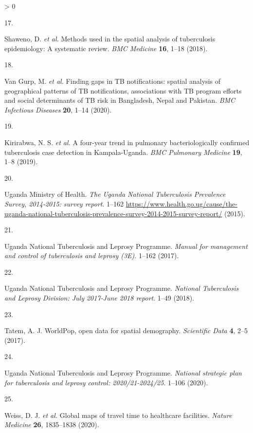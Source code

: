 \documentclass[
]{article}
\newlength{\cslhangindent}
\newlength{\csllabelwidth}
\newenvironment{CSLReferences}[2] %
 {%
  \setlength{\parindent}{0pt}
  \ifodd #1 \everypar{\setlength{\hangindent}{\cslhangindent}}\ignorespaces\fi
  \ifnum #2 > 0
  \setlength{\parskip}{#2\baselineskip}
  \fi
 }%
 {}
\newcommand{\CSLLeftMargin}[1]{\parbox[t]{\csllabelwidth}{#1}}
\newcommand{\CSLRightInline}[1]{\parbox[t]{\linewidth - \csllabelwidth}{#1}\break}
\begin{document}
\begin{CSLReferences}{0}{0}
\leavevmode\hypertarget{ref-Shaweno2018}{}%
\CSLLeftMargin{17. }
\CSLRightInline{Shaweno, D. \emph{et al.} {Methods used in the spatial analysis of tuberculosis epidemiology: A systematic review}. \emph{BMC Medicine} \textbf{16}, 1--18 (2018).}

\leavevmode\hypertarget{ref-VanGurp2020}{}%
\CSLLeftMargin{18. }
\CSLRightInline{Van Gurp, M. \emph{et al.} {Finding gaps in TB notifications: spatial analysis of geographical patterns of TB notifications, associations with TB program efforts and social determinants of TB risk in Bangladesh, Nepal and Pakistan}. \emph{BMC Infectious Diseases} \textbf{20}, 1--14 (2020).}

\leavevmode\hypertarget{ref-Kirirabwa2019}{}%
\CSLLeftMargin{19. }
\CSLRightInline{Kirirabwa, N. S. \emph{et al.} {A four-year trend in pulmonary bacteriologically confirmed tuberculosis case detection in Kampala-Uganda}. \emph{BMC Pulmonary Medicine} \textbf{19}, 1--8 (2019).}

\leavevmode\hypertarget{ref-UgandaMinistryofHealth2015}{}%
\CSLLeftMargin{20. }
\CSLRightInline{Uganda Ministry of Health. \emph{{The Uganda National Tuberculosis Prevalence Survey, 2014-2015: survey report}}. 1--162 \url{https://www.health.go.ug/cause/the-uganda-national-tuberculosis-prevalence-survey-2014-2015-survey-report/} (2015).}

\leavevmode\hypertarget{ref-UgandaNationalTuberculosisandLeprosyProgramme2017}{}%
\CSLLeftMargin{21. }
\CSLRightInline{Uganda National Tuberculosis and Leprosy Programme. \emph{{Manual for management and control of tuberculosis and leprosy (3E)}}. 1--162 (2017).}

\leavevmode\hypertarget{ref-UgandaNationalTuberculosisandLeprosyProgramme2018}{}%
\CSLLeftMargin{22. }
\CSLRightInline{Uganda National Tuberculosis and Leprosy Programme. \emph{{National Tuberculosis and Leprosy Division: July 2017-June 2018 report}}. 1--49 (2018).}

\leavevmode\hypertarget{ref-Tatem2017}{}%
\CSLLeftMargin{23. }
\CSLRightInline{Tatem, A. J. {WorldPop, open data for spatial demography}. \emph{Scientific Data} \textbf{4}, 2--5 (2017).}

\leavevmode\hypertarget{ref-UgandaNationalTuberculosisandLeprosyProgramme2020a}{}%
\CSLLeftMargin{24. }
\CSLRightInline{Uganda National Tuberculosis and Leprosy Programme. \emph{{National strategic plan for tuberculosis and leprosy control: 2020/21-2024/25}}. 1--106 (2020).}

\leavevmode\hypertarget{ref-Weiss2020}{}%
\CSLLeftMargin{25. }
\CSLRightInline{Weiss, D. J. \emph{et al.} {Global maps of travel time to healthcare facilities}. \emph{Nature Medicine} \textbf{26}, 1835--1838 (2020).}


\end{CSLReferences}
\end{document}
